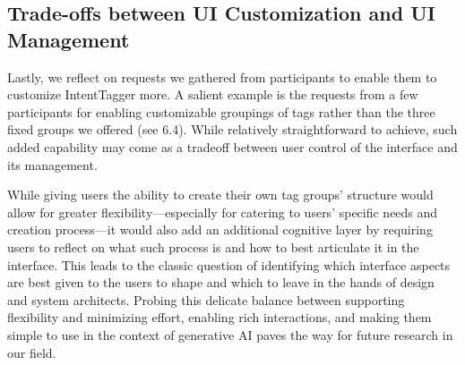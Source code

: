 \subsection{\textbf{Trade-offs between UI Customization and UI Management }}

Lastly, we reflect on requests we gathered from participants to enable them to customize IntentTagger more. A salient example is the requests from a few participants for enabling customizable groupings of tags rather than the three fixed groups we offered (see 6.4). While relatively straightforward to achieve, such added capability may come as a tradeoff between user control of the interface and its management. 



While giving users the ability to create their own tag groups' structure would allow for greater flexibility---especially for catering to users' specific needs and creation process---it would also add an additional cognitive layer by requiring users to reflect on what such process is and how to best articulate it in the interface. 
This leads to the classic question of identifying which interface aspects are best given to the users to shape and which to leave in the hands of design and system architects. 
Probing this delicate balance between supporting flexibility and minimizing effort, enabling rich interactions, and making them simple to use in the context of generative AI paves the way for future research in our field.


\subsection{}


